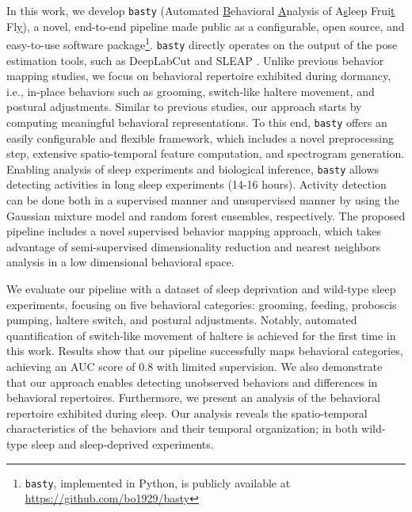 In this work, we develop \texttt{basty} (Automated \underline{B}ehavioral \underline{A}nalysis of A\underline{s}leep Frui\underline{t} Fl\underline{y}), a novel, end-to-end pipeline made public as a configurable, open source, and easy-to-use software package\footnote{\texttt{basty}, implemented in Python, is publicly available at \url{https://github.com/bo1929/basty}}.
\texttt{basty} directly operates on the output of the pose estimation tools, such as DeepLabCut \citep{mathis_deeplabcut_2018} and SLEAP \cite{pereira_sleap_2022}.
Unlike previous behavior mapping studies, we focus on behavioral repertoire exhibited during dormancy, i.e., in-place behaviors such as grooming, switch-like haltere movement, and postural adjustments.
Similar to previous studies, our approach starts by computing meaningful behavioral representations.
To this end, \texttt{basty} offers an easily configurable and flexible framework, which includes a novel preprocessing step, extensive spatio-temporal feature computation, and spectrogram generation.
Enabling analysis of sleep experiments and biological inference, \texttt{basty} allows detecting activities in long sleep experiments (14-16 hours).
Activity detection can be done both in a supervised manner and unsupervised manner by using the Gaussian mixture model and random forest ensembles, respectively.
The proposed pipeline includes a novel supervised behavior mapping approach, which takes advantage of semi-supervised dimensionality reduction and nearest neighbors analysis in a low dimensional behavioral space.

We evaluate our pipeline with a dataset of sleep deprivation and wild-type sleep experiments, focusing on five behavioral categories: grooming, feeding, proboscis pumping, haltere switch, and postural adjustments.
Notably, automated quantification of switch-like movement of haltere is achieved for the first time in this work.
Results show that our pipeline successfully maps behavioral categories, achieving an AUC score of 0.8 with limited supervision.
We also demonstrate that our approach enables detecting unobserved behaviors and differences in behavioral repertoires.
Furthermore, we present an analysis of the behavioral repertoire exhibited during sleep.
Our analysis reveals the spatio-temporal characteristics of the behaviors and their temporal organization; in both wild-type sleep and sleep-deprived experiments.

